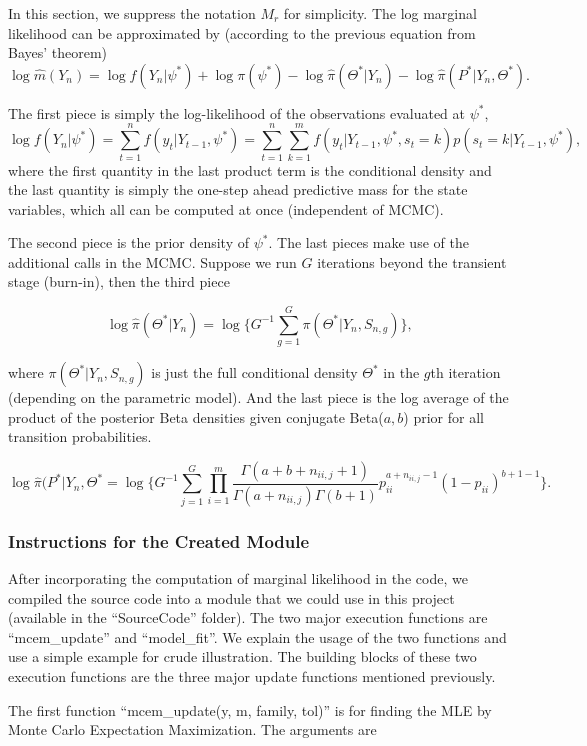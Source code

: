 \documentclass{article}
\begin{document}
In this section, we suppress the notation $M_r$ for simplicity. The log
marginal likelihood can be approximated by (according to the previous
equation from Bayes' theorem)
\[\log\hat{m}(Y_n)=\log f(Y_n|\psi^{*})+\log\pi(\psi^{*})-\log\hat{\pi}(\Theta^{*}|Y_n)-\log\hat{\pi}(P^{*}|Y_n,\Theta^{*}).\]

The first piece is simply the log-likelihood of the observations
evaluated at $\psi^{*}$,
\[\log f(Y_n|\psi^{*})=\sum_{t=1}^n f(y_t|Y_{t-1},\psi^{*})=\sum_{t=1}^n\sum_{k=1}^m f(y_t|Y_{t-1},\psi^{*}, s_t=k)p(s_t=k|Y_{t-1},\psi^{*}),\]
where the first quantity in the last product term is the conditional
density and the last quantity is simply the one-step ahead predictive
mass for the state variables, which all can be computed at once
(independent of MCMC).

The second piece is the prior density of $\psi^{*}$. The last pieces
make use of the additional calls in the MCMC. Suppose we run $G$
iterations beyond the transient stage (burn-in), then the third piece

\[\log\hat{\pi}(\Theta^{*}|Y_n)=\log\{G^{-1}\sum_{g=1}^G \pi(\Theta^{*}|Y_n, S_{n,g})\},\]

where $\pi(\Theta^{*}|Y_n, S_{n,g})$ is just the full conditional
density $\Theta^{*}$ in the $g$th iteration (depending on the parametric
model). And the last piece is the log average of the product of the
posterior Beta densities given conjugate Beta($a,b$) prior for all
transition probabilities.

\[\log\hat{\pi}(P^{*}|Y_n,\Theta^{*}=\log\{G^{-1}\sum_{j=1}^G\prod_{i=1}^m \frac{\Gamma(a+b+n_{ii,j}+1)}{\Gamma(a+n_{ii,j})\Gamma(b+1)}p_{ii}^{a+n_{ii,j}-1}(1-p_{ii})^{b+1-1}\}.\]

\subsubsection{Instructions for the Created
Module}\label{instructions-for-the-created-module}

After incorporating the computation of marginal likelihood in the code,
we compiled the source code into a module that we could use in this
project (available in the ``SourceCode'' folder). The two major
execution functions are ``mcem\_update'' and ``model\_fit''. We explain
the usage of the two functions and use a simple example for crude
illustration. The building blocks of these two execution functions are
the three major update functions mentioned previously.

The first function ``mcem\_update(y, m, family, tol)'' is for finding
the MLE by Monte Carlo Expectation Maximization. The arguments are
\end{document}
